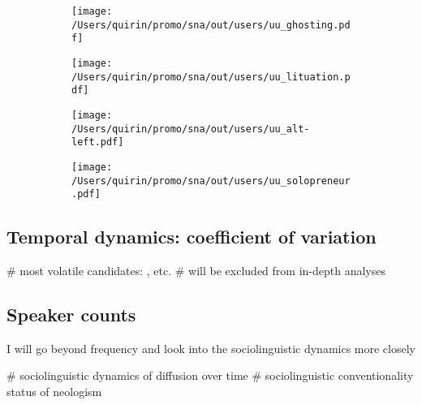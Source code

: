 \documentclass[
  a4paper,
  ]{scrartcl}
\begin{document}
    \begin{figure}[H]
      \caption{Cumulative counts for unique speakers that have used the target neologisms.}
      \centering
      \begin{subfigure}{.45\linewidth}
        \caption{}
        \centering
        \texttt{[image: /Users/quirin/promo/sna/out/users/uu\_ghosting.pdf]}
      \end{subfigure}
      \begin{subfigure}{.45\linewidth}
        \caption{}
        \centering
        \texttt{[image: /Users/quirin/promo/sna/out/users/uu\_lituation.pdf]}
      \end{subfigure}

      \begin{subfigure}{.45\linewidth}
        \caption{}
        \centering
        \texttt{[image: /Users/quirin/promo/sna/out/users/uu\_alt-left.pdf]}
      \end{subfigure}
      \begin{subfigure}{.45\linewidth}
        \caption{}
        \centering
        \texttt{[image: /Users/quirin/promo/sna/out/users/uu\_solopreneur.pdf]}
      \end{subfigure}
    \end{figure}

  \subsection{Temporal dynamics: coefficient of variation}

    \begin{easylist}[itemize]
      # most volatile candidates: ,  etc.
      # will be excluded from in-depth analyses
    \end{easylist}

  \subsection{Speaker counts}

      I will go beyond frequency and look into the sociolinguistic dynamics more closely

      \begin{easylist}[itemize]
        # sociolinguistic dynamics of diffusion over time
        # sociolinguistic conventionality status of neologism
      \end{easylist}
\end{document}
